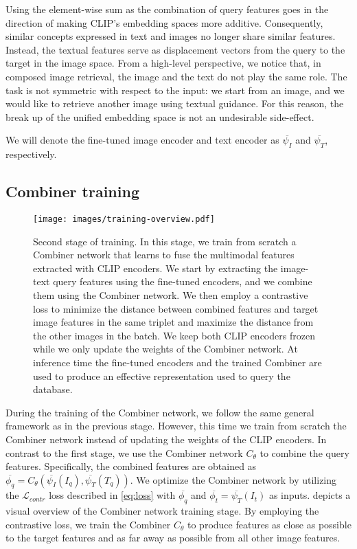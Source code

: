 \documentclass[acmlarge]{acmart}
\begin{document}
Using the element-wise sum as the combination of query features goes in the direction of making CLIP's embedding spaces more additive. Consequently, similar concepts expressed in text and images no longer share similar features. Instead, the textual features serve as displacement vectors from the query to the target in the image space.
From a high-level perspective, we notice that, in composed image retrieval, the image and the text do not play the same role. The task is not symmetric with respect to the input: we start from an image, and we would like to retrieve another image using textual guidance.
For this reason, the break up of the unified embedding space is not an undesirable side-effect.

We will denote the fine-tuned image encoder and text encoder as $\overline{\psi_{I}}$ and $\overline{\psi_{T}}$, respectively.

\subsection{Combiner training}\label{sec:combiner_training}
\begin{figure*}[tb]
 \texttt{[image: images/training-overview.pdf]}
  \caption{Second stage of training. In this stage, we train from scratch a Combiner network that learns to fuse the multimodal features extracted with CLIP encoders. We start by extracting the image-text query features using the fine-tuned encoders, and we combine them using the Combiner network. We then employ a contrastive loss to minimize the distance between combined features and target image features in the same triplet and maximize the distance from the other images in the batch. We keep both CLIP encoders frozen while we only update the weights of the Combiner network.
  At inference time the fine-tuned encoders and the trained Combiner are used to produce an effective representation used to query the database.}
  \label{fig:training}
\end{figure*}

During the training of the Combiner network, we follow the same general framework as in the previous stage. However, this time we train from scratch the Combiner network instead of updating the weights of the CLIP encoders.
In contrast to the first stage, we use the Combiner network $C_{\theta}$ to combine the query features. Specifically, the combined features are obtained as $\overline{\phi_q} = C_{\theta}(\overline{\psi_{I}}(I_q), \overline{\psi_{T}}(T_q))$.
We optimize the Combiner network by utilizing the $\mathcal{L}_{contr}$ loss described in \cref{eq:loss} with $\overline{\phi_q}$ and $\overline{\phi_t} = \overline{\psi_{T}}(I_t)$ as inputs.  depicts a visual overview of the Combiner network training stage.
By employing the contrastive loss, we train the Combiner $C_{\theta}$ to produce features as close as possible to the target features and as far away as possible from all other image features.
\end{document}
